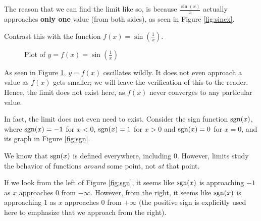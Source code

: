 The reason that we can find the limit like so, is because $\frac{\sin(x)}{x}$ actually approaches
\textbf{only one} value (from both sides), as seen in Figure \ref{fig:sincx}.

Contrast this with the function $f(x) = \sin\left(\frac{1}{x}\right)$.

\begin{figure}
    \centering
    \caption{Plot of $y = f(x) = \sin\left(\frac{1}{x}\right)$}
    \label{fig:sinrx}
\end{figure}

As seen in Figure \ref{fig:sinrx}, $y = f(x)$ oscillates wildly. It does not even approach a value as $f(x)$ gets smaller; we will leave
the verification of this to the reader. Hence, the limit does not exist here, as $f(x)$ never converges to any
particular value.

In fact, the limit does not even need to exist. Consider the sign function $\operatorname{sgn}(x)$, where
$\operatorname{sgn}(x) = -1$ for $x < 0$, $\operatorname{sgn}(x) = 1$ for $x > 0$ and $\operatorname{sgn}(x) = 0$ for $x = 0$, and its
graph in Figure \ref{fig:sgn}.

We know that $\operatorname{sgn}(x)$ is defined everywhere, including $0$. However, limits study the behavior of
functions \textit{around} some point, not \textit{at} that point.

If we look from the left of Figure \ref{fig:sgn}, it seems like $\operatorname{sgn}(x)$ is approaching $-1$ as $x$ approaches $0$ from
$-\infty$. However, from the right, it seems like $\operatorname{sgn}(x)$ is approaching $1$ as $x$ approaches $0$
from $+\infty$ (the positive sign is explicitly used here to emphasize that we approach from the right).

